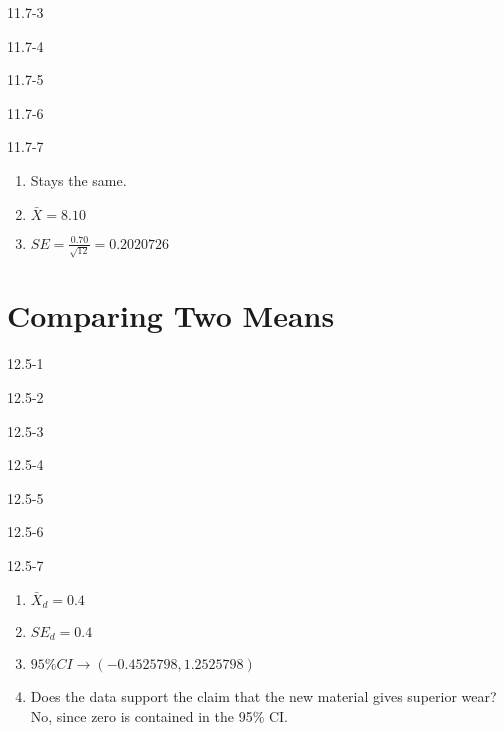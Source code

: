 \begin{exsol@solution}{11.7-3}
\end{exsol@solution}
\begin{exsol@solution}{11.7-4}
\end{exsol@solution}
\begin{exsol@solution}{11.7-5}
\end{exsol@solution}
\begin{exsol@solution}{11.7-6}
\end{exsol@solution}
\begin{exsol@solution}{11.7-7}
\begin{enumerate}
  \item Stays the same.
  \item $\bar{X} = 8.10$
  \item $ SE = \frac{0.70}{\sqrt{12}} = 0.2020726$
\end{enumerate}

\end{exsol@solution}
\setcounter{chapter}{11}\chapter{Comparing Two Means}
\begin{exsol@solution}{12.5-1}

\end{exsol@solution}
\begin{exsol@solution}{12.5-2}
\end{exsol@solution}
\begin{exsol@solution}{12.5-3}
\end{exsol@solution}
\begin{exsol@solution}{12.5-4}

\end{exsol@solution}
\begin{exsol@solution}{12.5-5}
\end{exsol@solution}
\begin{exsol@solution}{12.5-6}
\end{exsol@solution}
\begin{exsol@solution}{12.5-7}


\begin{enumerate}
  \item $\bar{X}_d = 0.4 $
  \item $SE_d = 0.4$
  \item $95\% CI  \rightarrow ( -0.4525798, 1.2525798 )$
  \item Does the data support the claim that the new material gives superior wear?  No, since zero is contained in the 95\% CI.
\end{enumerate}

\end{exsol@solution}
